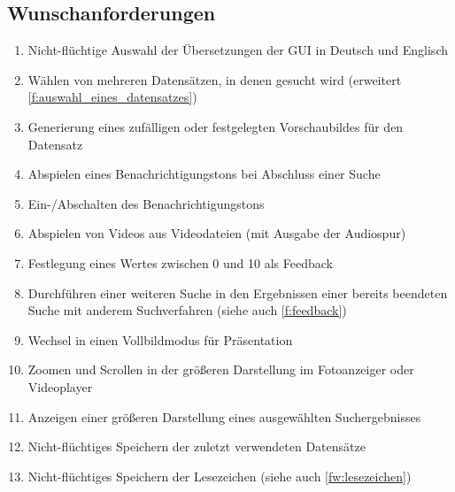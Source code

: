 \subsection{Wunschanforderungen}
\begin{enumerate} [label=\bfseries /FW \arabic*0/, leftmargin=*]
	\item Nicht-flüchtige Auswahl der Übersetzungen der \gls{GUI} in Deutsch und Englisch \label{fw:sprache}
	\newline
	\item Wählen von mehreren Datensätzen, in denen gesucht wird (erweitert \ref{f:auswahl_eines_datensatzes}) \label{fw:mehrere_datensaetze_waehlen}
	\item Generierung eines zufälligen oder festgelegten Vorschaubildes für den Datensatz \label{fw:vorschaubild}
	\newline
	\item Abspielen eines Benachrichtigungstons bei Abschluss einer Suche \label{fw:signalton}
	\item Ein-/Abschalten des Benachrichtigungstons \label{fw:signalton_einaus}
	\item Abspielen von Videos aus Videodateien (mit Ausgabe der Audiospur) \label{fw:echtes_video_abspielen}
	\newline
	\item Festlegung eines Wertes zwischen 0 und 10 als \gls{Feedback} \label{fw:zehner_feedback}
	\item Durchführen einer weiteren Suche in den Ergebnissen einer bereits beendeten Suche mit anderem \gls{Suchverfahren} (siehe auch \ref{f:feedback}) \label{fw:weitere_suche}
	\newline
	\item Wechsel in einen Vollbildmodus für Präsentation \label{fw:präsentation}
	\item Zoomen und Scrollen in der größeren Darstellung im Fotoanzeiger oder Videoplayer \label{fw:zoom_scroll}
	\item Anzeigen einer größeren Darstellung eines ausgewählten Suchergebnisses \label{fw:groesseres_suchergebnis}
	\newline
	\item Nicht-flüchtiges Speichern der zuletzt verwendeten Datensätze \label{fw:speichern_historie}
	\item Nicht-flüchtiges Speichern der \gls{Lesezeichen} (siehe auch \ref{fw:lesezeichen}) \label{fw:speichern_lesezeichen}

\end{enumerate}

